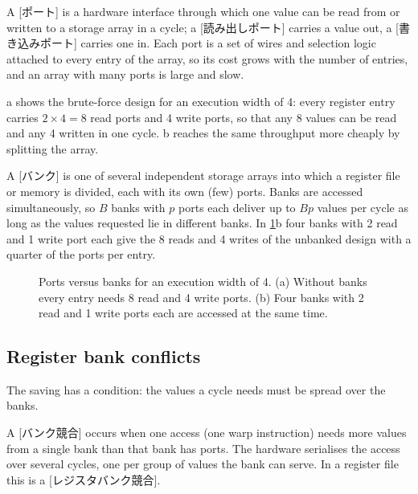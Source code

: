 \documentclass[../main.tex]{subfiles}
\begin{document}
\begin{definition}[Port]
  \label{def:l04-port}
  A [ポート] is a hardware interface through which one value
  can be read from or written to a storage array in a cycle; a
  [読み出しポート] carries a value out, a
  [書き込みポート] carries one in.  Each port is a set
  of wires and selection logic attached to every entry of the array,
  so its cost grows with the number of entries, and an array with many
  ports is large and slow.
\end{definition}

a shows the brute-force design for an
execution width of 4: every register entry carries $2 \times 4 = 8$
read ports and 4 write ports, so that any 8 values can be read and any
4 written in one cycle.  b reaches the
same throughput more cheaply by splitting the array.

\begin{definition}[Bank]
  \label{def:l04-bank}
  A [バンク] is one of several independent storage arrays
  into which a register file or memory is divided, each with its own
  (few) ports.  Banks are accessed simultaneously, so $B$ banks with
  $p$ ports each deliver up to $Bp$ values per cycle as long as the
  values requested lie in different banks.  In
  \cref{fig:l04-ports-vs-banks}b four banks with 2 read and 1 write
  port each give the 8 reads and 4 writes of the unbanked design with
  a quarter of the ports per entry.
\end{definition}

\begin{figure}[htbp]
  \centering
  
  \caption{Ports versus banks for an execution width of 4.  (a) Without
    banks every entry needs 8 read and 4 write ports.  (b) Four banks
    with 2 read and 1 write ports each are accessed at the same time.}
  \label{fig:l04-ports-vs-banks}
\end{figure}

\subsection{Register bank conflicts}

The saving has a condition: the values a cycle needs must be spread over
the banks.

\begin{definition}
  \label{def:l04-bank-conflict}
  A [バンク競合] occurs when one access (one warp
  instruction) needs more values from a single bank than that bank has
  ports.  The hardware serialises the access over several cycles, one
  per group of values the bank can serve.  In a register file this is a
  [レジスタバンク競合].
\end{definition}
\end{document}
